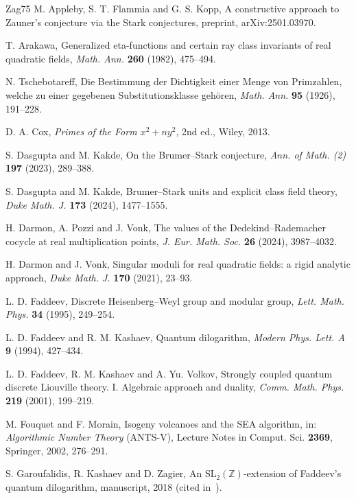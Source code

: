 \documentclass[11pt]{amsart}
\numberwithin{equation}{section}
\theoremstyle{plain}
\theoremstyle{definition}
\theoremstyle{remark}
\begin{document}
\begin{thebibliography}{Zag75}
 M. Appleby, S. T. Flammia and G. S. Kopp, A constructive approach to Zauner's conjecture via the Stark conjectures, preprint, arXiv:2501.03970.

 T. Arakawa, Generalized eta-functions and certain ray class invariants of real quadratic fields, \emph{Math. Ann.} \textbf{260} (1982), 475--494.

 N. Tschebotareff, Die Bestimmung der Dichtigkeit einer Menge von Primzahlen, welche zu einer gegebenen Substitutionsklasse gehören, \emph{Math. Ann.} \textbf{95} (1926), 191--228.

 D. A. Cox, \emph{Primes of the Form $x^2+ny^2$}, 2nd ed., Wiley, 2013.

 S. Dasgupta and M. Kakde, On the Brumer--Stark conjecture, \emph{Ann. of Math. (2)} \textbf{197} (2023), 289--388.

 S. Dasgupta and M. Kakde, Brumer--Stark units and explicit class field theory, \emph{Duke Math. J.} \textbf{173} (2024), 1477--1555.

 H. Darmon, A. Pozzi and J. Vonk, The values of the Dedekind--Rademacher cocycle at real multiplication points, \emph{J. Eur. Math. Soc.} \textbf{26} (2024), 3987--4032.

 H. Darmon and J. Vonk, Singular moduli for real quadratic fields: a rigid analytic approach, \emph{Duke Math. J.} \textbf{170} (2021), 23--93.

 L. D. Faddeev, Discrete Heisenberg--Weyl group and modular group, \emph{Lett. Math. Phys.} \textbf{34} (1995), 249--254.

 L. D. Faddeev and R. M. Kashaev, Quantum dilogarithm, \emph{Modern Phys. Lett. A} \textbf{9} (1994), 427--434.

 L. D. Faddeev, R. M. Kashaev and A. Yu. Volkov, Strongly coupled quantum discrete Liouville theory. I. Algebraic approach and duality, \emph{Comm. Math. Phys.} \textbf{219} (2001), 199--219.

 M. Fouquet and F. Morain, Isogeny volcanoes and the SEA algorithm, in: \emph{Algorithmic Number Theory} (ANTS-V), Lecture Notes in Comput. Sci. \textbf{2369}, Springer, 2002, 276--291.

 S. Garoufalidis, R. Kashaev and D. Zagier, An $\mathrm{SL}_2(\mathbb Z)$-extension of Faddeev's quantum dilogarithm, manuscript, 2018 (cited in~\cite{RW}).


\end{thebibliography}
\end{document}

